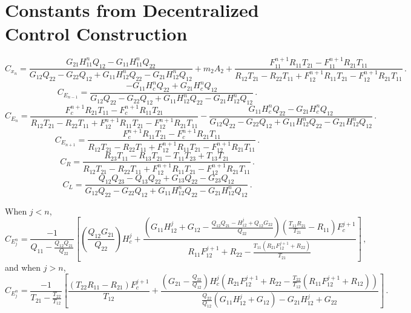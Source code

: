 \documentclass[11pt]{ucthesis}
\begin{document}
\nocite{*}



\appendix
\chapter{Constants from Decentralized Control Construction}
\[
C_{x_n} = \frac{G_{21}H_{11}^nQ_{12}-G_{11}H_{11}^nQ_{22}}{G_{12}Q_{22}-G_{22}Q_{12}+G_{11}H_{12}^nQ_{22}-G_{21}H_{12}^nQ_{12}}+m_2A_2+\frac{F_{11}^{n+1}R_{11}T_{21}-F_{11}^{n+1}R_{21}T_{11}}{R_{12}T_{21}-R_{22}T_{11}+F_{12}^{n+1}R_{11}T_{21}-F_{12}^{n+1}R_{21}T_{11}} \,.
\]
\[
C_{E_{n-1}}= \frac{-G_{11}H_c^nQ_{22}+G_{21}H_c^nQ_{12}}{G_{12}Q_{22}-G_{22}Q_{12}+G_{11}H_{12}^nQ_{22}-G_{21}H_{12}^nQ_{12}} \,.
\]
\[
C_{E_n} = \frac{F_c^{n+1}R_{21}T_{11}-F_c^{n+1}R_{11}T_{21}}{R_{12}T_{21}-R_{22}T_{11}+F_{12}^{n+1}R_{11}T_{21}-F_{12}^{n+1}R_{21}T_{11}}-\frac{G_{11}H_c^nQ_{22}-G_{21}H_c^nQ_{12}}{G_{12}Q_{22}-G_{22}Q_{12}+G_{11}H_{12}^nQ_{22}-G_{21}H_{12}^nQ_{12}} \,.
\]
\[
C_{E_{n+1}} = \frac{F_c^{n+1}R_{11}T_{21}-F_c^{n+1}R_{21}T_{11}}{R_{12}T_{21}-R_{22}T_{11}+F_{12}^{n+1}R_{11}T_{21}-F_{12}^{n+1}R_{21}T_{11}} \,.
\]
\[
C_R = \frac{R_{23}T_{11}-R_{13}T_{21}-T_{11}T_{23}+T_{13}T_{21}}{R_{12}T_{21}-R_{22}T_{11}+F_{12}^{n+1}R_{11}T_{21}-F_{12}^{n+1}R_{21}T_{11}} \,.
\]
\[
C_L = \frac{Q_{12}Q_{23}-Q_{13}Q_{22}+G_{13}Q_{22}-G_{23}Q_{12}}{G_{12}Q_{22}-G_{22}Q_{12}+G_{11}H_{12}^nQ_{22}-G_{21}H_{12}^nQ_{12}} \,.
\]

When $j<n$,
\[
C_{E_j^n} = \frac{-1}{Q_{11}-\frac{Q_{12}Q_{21}}{Q_{22}}}\left[\left(\frac{Q_{12}G_{21}}{Q_{22}}\right)H_c^j+\frac{\left(G_{11}H_{12}^j+G_{12}-\frac{Q_{12}Q_{21}-H_{12}^j+Q_{12}G_{22}}{Q_{22}}\right)\left(\frac{T_{11}R_{21}}{T_{21}}-R_{11}\right)F_c^{j+1}}{R_{11}F_{12}^{j+1}+R_{22}-\frac{T_{11}(R_{21}F_{12}^{j+1}+R_{22})}{T_{21}}}\right] \,,
\]
and when $j>n$,
\[
C_{E_j^n} = \frac{-1}{T_{21}-\frac{T_{22}}{T_{12}}}\left[\frac{(T_{22}R_{11}-R_{21})F_c^{j+1}}{T_{12}}+\frac{\left(G_{21}-\frac{Q_{22}}{Q_{12}}\right)H_c^j\left(R_{21}F_{12}^{j+1}+R_{22}-\frac{T_{22}}{T_{12}}\left(R_{11}F_{12}^{j+1}+R_{12}\right)\right)}{\frac{Q_{22}}{Q_{12}}\left(G_{11}H_{12}^j+G_{12}\right)-G_{21}H_{12}^j+G_{22}}\right] \,.
\]
\end{document}

